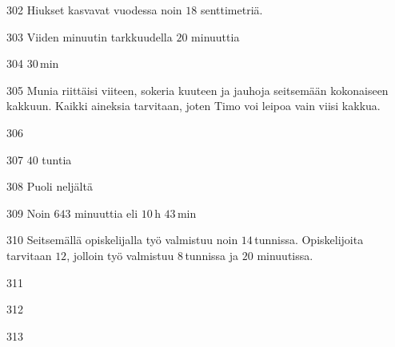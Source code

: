 \begin{Vastaus}{302}
Hiukset kasvavat vuodessa noin $18$ senttimetriä.
	
\end{Vastaus}
\begin{Vastaus}{303}
Viiden minuutin tarkkuudella $20$ minuuttia
	
\end{Vastaus}
\begin{Vastaus}{304}
        $30$\,min
    
\end{Vastaus}
\begin{Vastaus}{305}
Munia riittäisi viiteen, sokeria kuuteen ja jauhoja seitsemään kokonaiseen kakkuun. Kaikki aineksia tarvitaan, joten Timo voi leipoa vain viisi kakkua.
	
\end{Vastaus}
\begin{Vastaus}{306}
	
\end{Vastaus}
\begin{Vastaus}{307}
		$40$ tuntia
	
\end{Vastaus}
\begin{Vastaus}{308}
Puoli neljältä
	
\end{Vastaus}
\begin{Vastaus}{309}
        Noin $643$ minuuttia eli $10$\,h $43$\,min
    
\end{Vastaus}
\begin{Vastaus}{310}
Seitsemällä opiskelijalla työ valmistuu noin $14$\,tunnissa. Opiskelijoita tarvitaan $12$, jolloin työ valmistuu $8$\,tunnissa ja $20$ minuutissa.
	
\end{Vastaus}
\begin{Vastaus}{311}
	
\end{Vastaus}
\begin{Vastaus}{312}
	
\end{Vastaus}
\begin{Vastaus}{313}
	
\end{Vastaus}
